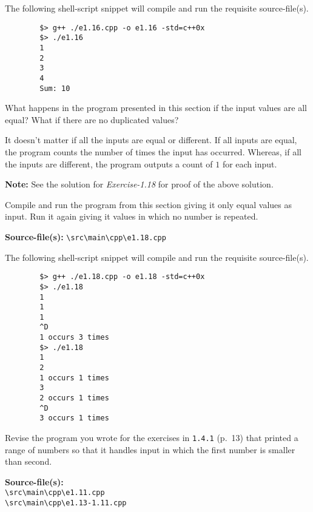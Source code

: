 \documentclass[12pt, a4paper]{article}
\begin{document}
    \noindent The following shell-script snippet will compile and run the requisite source-file(s).
    \begin{verbatim}
        $> g++ ./e1.16.cpp -o e1.16 -std=c++0x
        $> ./e1.16
        1
        2
        3
        4
        Sum: 10
    \end{verbatim}

    \bigskip
    \begin{tcolorbox}[title={Exercise: 1.17}]
        What happens in the program presented in this section if the input values are all equal?
        What if there are no duplicated values?
    \end{tcolorbox}
    \noindent It doesn't matter if all the inputs are equal or different.
    If all inputs are equal, the program counts the number of times the input has occurred.
    Whereas, if all the inputs are different, the program outputs a count of $1$ for each input.

    \noindent\textbf{Note:} See the solution for \textit{Exercise-1.18} for proof of the above solution.

    \bigskip
    \begin{tcolorbox}[title={Exercise: 1.18}]
        Compile and run the program from this section giving it only equal values as input.
        Run it again giving it values in which no number is repeated.
    \end{tcolorbox}
    \noindent\textbf{Source-file(s):} \texttt{\textbackslash src\textbackslash main\textbackslash cpp\textbackslash e1.18.cpp}

    \noindent The following shell-script snippet will compile and run the requisite source-file(s).
    \begin{verbatim}
        $> g++ ./e1.18.cpp -o e1.18 -std=c++0x
        $> ./e1.18
        1
        1
        1
        ^D
        1 occurs 3 times
        $> ./e1.18
        1
        2
        1 occurs 1 times
        3
        2 occurs 1 times
        ^D
        3 occurs 1 times
    \end{verbatim}

    \bigskip
    \begin{tcolorbox}[title={Exercise: 1.19}]
        Revise the program you wrote for the exercises in \texttt{1.4.1} (p.~13) that printed a range of numbers so that it handles input in which the first number is smaller than second.
    \end{tcolorbox}
    \noindent\textbf{Source-file(s):}
    \\ \texttt{\textbackslash src\textbackslash main\textbackslash cpp\textbackslash e1.11.cpp}
    \\ \texttt{\textbackslash src\textbackslash main\textbackslash cpp\textbackslash e1.13-1.11.cpp}
\end{document}

